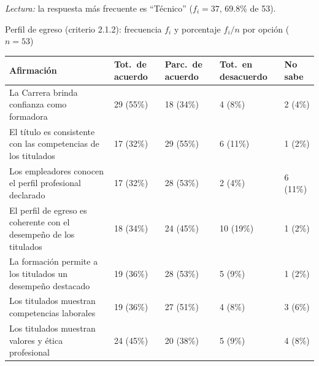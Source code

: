 \textit{Lectura:} la respuesta más frecuente es ``Técnico'' ($f_i = 37$, 69.8\% de 53).

\begin{mitabla}{Perfil de egreso (criterio 2.1.2): frecuencia $f_i$ y porcentaje $f_i/n$ por opción ($n=53$)}
\begin{tabular}{L{5.6cm}C{2.0cm}C{2.0cm}C{2.1cm}C{1.5cm}}
\toprule
Afirmación & Tot.\ de acuerdo & Parc.\ de acuerdo & Tot.\ en desacuerdo & No sabe \\
\midrule
La Carrera brinda confianza como formadora & 29 (55\%) & 18 (34\%) & 4 (8\%) & 2 (4\%) \\
El título es consistente con las competencias de los titulados & 17 (32\%) & 29 (55\%) & 6 (11\%) & 1 (2\%) \\
Los empleadores conocen el perfil profesional declarado & 17 (32\%) & 28 (53\%) & 2 (4\%) & 6 (11\%) \\
El perfil de egreso es coherente con el desempeño de los titulados & 18 (34\%) & 24 (45\%) & 10 (19\%) & 1 (2\%) \\
La formación permite a los titulados un desempeño destacado & 19 (36\%) & 28 (53\%) & 5 (9\%) & 1 (2\%) \\
Los titulados muestran competencias laborales & 19 (36\%) & 27 (51\%) & 4 (8\%) & 3 (6\%) \\
Los titulados muestran valores y ética profesional & 24 (45\%) & 20 (38\%) & 5 (9\%) & 4 (8\%) \\
\bottomrule
\end{tabular}
\end{mitabla}

